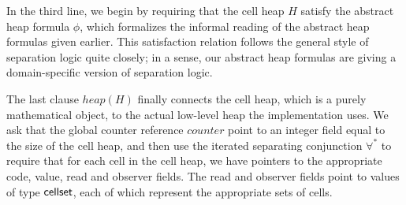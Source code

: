 In the third line, we begin by requiring that the cell heap $H$ satisfy
the abstract heap formula $\phi$, which formalizes the informal
reading of the abstract heap formulas given earlier. This satisfaction
relation follows the general style of separation logic quite closely; 
in a sense, our abstract heap formulas are giving a domain-specific
version of separation logic.

The last clause $heap(H)$ finally connects the cell heap, which is a purely
mathematical object, to the actual low-level heap the implementation
uses. We ask that the global counter reference $counter$ point to an integer
field equal to the size of the cell heap, and then use the iterated
separating conjunction $\forall^*$ to require that for each cell in
the cell heap, we have pointers to the appropriate code, value, read
and observer fields. The read and observer fields point to values of
type $\mathsf{cellset}$, each of which represent the appropriate sets of cells. 


